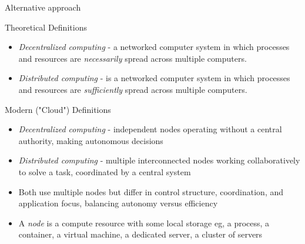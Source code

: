 \begin{slide}{Alternative approach}
  \begin{block}{Theoretical Definitions}
    \begin{itemize}\tightlist
    \item \emph{Decentralized computing} - a networked computer system in which processes and resources are
      \emph{necessarily} spread across multiple computers.
    \item \emph{Distributed computing} - is a networked computer system in which processes and resources are
      \emph{sufficiently} spread across multiple computers.
    \end{itemize}
  \end{block}
  \begin{alertblock}{Modern ("Cloud") Definitions}
  \begin{itemize}\tightlist
    \item \emph{Decentralized computing} - independent nodes operating without a central authority, making autonomous decisions
    \item \emph{Distributed computing} - multiple interconnected nodes working collaboratively to solve a task, coordinated by a central system
  \end{itemize}
\end{alertblock}
  \begin{itemize}\tightlist
    \item Both use multiple nodes but differ in control structure, 
    coordination, and application focus, balancing autonomy 
    versus efficiency
    \item A \emph{node} is a compute resource with some local storage
    eg, a process, a container, a virtual machine, a dedicated server, 
    a cluster of servers
  \end{itemize}
\end{slide}
